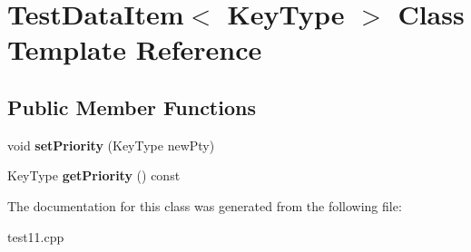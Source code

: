 \hypertarget{class_test_data_item}{\section{Test\+Data\+Item$<$ Key\+Type $>$ Class Template Reference}
\label{class_test_data_item}
}
\subsection*{Public Member Functions}
\begin{DoxyCompactItemize}
\item 
\hypertarget{class_test_data_item_a84667429c081b1dbb212956c88011216}{void {\bfseries set\+Priority} (Key\+Type new\+Pty)}\label{class_test_data_item_a84667429c081b1dbb212956c88011216}

\item 
\hypertarget{class_test_data_item_ac1632213d959555ec8f5aee8a1505d72}{Key\+Type {\bfseries get\+Priority} () const }\label{class_test_data_item_ac1632213d959555ec8f5aee8a1505d72}

\end{DoxyCompactItemize}


The documentation for this class was generated from the following file\+:\begin{DoxyCompactItemize}
\item 
test11.\+cpp\end{DoxyCompactItemize}
